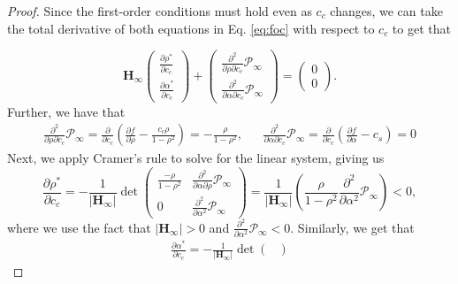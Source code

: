 \documentclass[12pt]{article}
\theoremstyle{definition}
\theoremstyle{remark}
\begin{document}
\begin{proof}
Since the first-order conditions must hold even as $c_c$ changes, we can take the total derivative of both equations in Eq. \eqref{eq:foc} with respect to $c_c$ to get that

\begin{equation*}
    \mathbf{H}_\infty
    \begin{pmatrix}
        \frac{\partial \rho^*}{\partial c_c} \\
        \frac{\partial \alpha^*}{\partial c_c}
    \end{pmatrix}
    +
    \begin{pmatrix}
        \frac{\partial^2}{\partial \rho \partial c_c} \mathcal{P}_\infty \\
        \frac{\partial^2}{\partial \alpha \partial c_c} \mathcal{P}_\infty
    \end{pmatrix}
    =
    \begin{pmatrix}
        0 \\ 0
    \end{pmatrix}.
\end{equation*}
Further, we have that
\begin{align*}
    \frac{\partial^2}{\partial \rho \partial c_c} \mathcal{P}_\infty = \frac{\partial}{\partial c_c} \left( \frac{\partial f}{\partial \rho} - \frac{c_c \rho}{1-\rho^2} \right) = - \frac{\rho}{1-\rho^2}, &&
    \frac{\partial^2}{\partial \alpha \partial c_c} \mathcal{P}_\infty = \frac{\partial}{\partial c_c} \left( \frac{\partial f}{\partial \alpha} - c_s \right) = 0
\end{align*}
Next, we apply Cramer's rule to solve for the linear system, giving us
\begin{equation*}
    \frac{\partial \rho^*}{\partial c_c} = - \frac{1}{|\mathbf{H}_\infty|} \det \begin{pmatrix}
        \frac{-\rho}{1-\rho^2} & \frac{\partial^2}{\partial \alpha \partial \rho } \mathcal{P}_\infty  \\
        0 &
        \frac{\partial^2}{\partial \alpha^2 } \mathcal{P}_\infty
    \end{pmatrix} = \frac{1}{|\mathbf{H}_\infty|} \left( \frac{\rho}{1-\rho^2} \frac{\partial^2}{\partial \alpha^2} \mathcal{P}_\infty \right)< 0,
\end{equation*}
where we use the fact that $|\mathbf{H}_\infty|>0$ and $\frac{\partial^2}{\partial \alpha^2} \mathcal{P}_\infty<0$. Similarly, we get that
\begin{align*}
    \frac{\partial \alpha^*}{\partial c_c} = - \frac{1}{|\mathbf{H}_\infty|} \det \begin{pmatrix}

\end{pmatrix}
\end{align*}
\end{proof}
\end{document}
